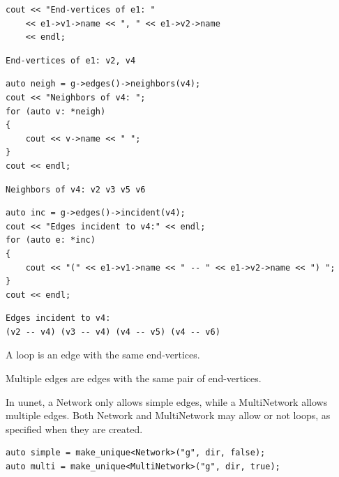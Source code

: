 \begin{lstlisting}[style=c++] 
cout << "End-vertices of e1: "
    << e1->v1->name << ", " << e1->v2->name 
    << endl;
\end{lstlisting}
\begin{lstlisting}[style=out]
End-vertices of e1: v2, v4
\end{lstlisting}

\begin{lstlisting}[style=c++]
auto neigh = g->edges()->neighbors(v4);
cout << "Neighbors of v4: ";
for (auto v: *neigh)
{
    cout << v->name << " ";
}
cout << endl;
\end{lstlisting}
\begin{lstlisting}[style=out]
Neighbors of v4: v2 v3 v5 v6 
\end{lstlisting}

\begin{lstlisting}[style=c++] 
auto inc = g->edges()->incident(v4);
cout << "Edges incident to v4:" << endl;
for (auto e: *inc)
{
    cout << "(" << e1->v1->name << " -- " << e1->v2->name << ") ";
}
cout << endl;
\end{lstlisting}
\begin{lstlisting}[style=out]
Edges incident to v4:
(v2 -- v4) (v3 -- v4) (v4 -- v5) (v4 -- v6) 
\end{lstlisting}

\begin{definition}[Loop]
A loop is an edge with the same end-vertices. 
\end{definition}

\begin{definition}
Multiple edges are edges with the same pair of end-vertices.
\end{definition}

In uunet, a Network only allows simple edges, while a MultiNetwork allows multiple edges. Both Network and MultiNetwork may allow or not loops, as specified when they are created.

\begin{lstlisting}[style=c++]
auto simple = make_unique<Network>("g", dir, false);
auto multi = make_unique<MultiNetwork>("g", dir, true);
\end{lstlisting}







